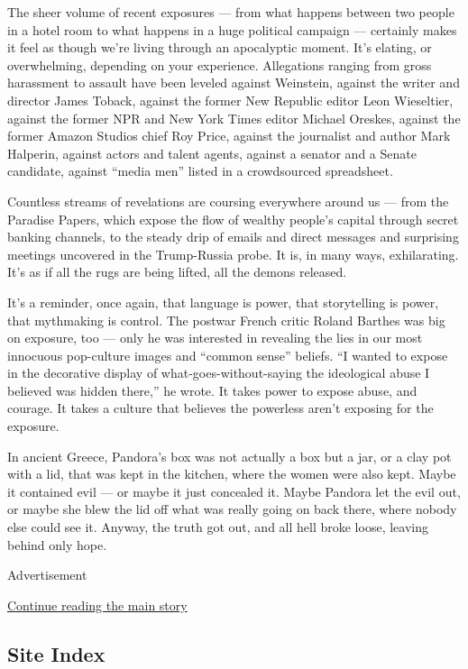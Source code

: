 The sheer volume of recent exposures --- from what happens between two
people in a hotel room to what happens in a huge political campaign ---
certainly makes it feel as though we're living through an apocalyptic
moment. It's elating, or overwhelming, depending on your experience.
Allegations ranging from gross harassment to assault have been leveled
against Weinstein, against the writer and director James Toback, against
the former New Republic editor Leon Wieseltier, against the former NPR
and New York Times editor Michael Oreskes, against the former Amazon
Studios chief Roy Price, against the journalist and author Mark
Halperin, against actors and talent agents, against a senator and a
Senate candidate, against ``media men'' listed in a crowdsourced
spreadsheet.

Countless streams of revelations are coursing everywhere around us ---
from the Paradise Papers, which expose the flow of wealthy people's
capital through secret banking channels, to the steady drip of emails
and direct messages and surprising meetings uncovered in the
Trump-Russia probe. It is, in many ways, exhilarating. It's as if all
the rugs are being lifted, all the demons released.

It's a reminder, once again, that language is power, that storytelling
is power, that mythmaking is control. The postwar French critic Roland
Barthes was big on exposure, too --- only he was interested in revealing
the lies in our most innocuous pop-culture images and ``common sense''
beliefs. ``I wanted to expose in the decorative display of
what-goes-without-saying the ideological abuse I believed was hidden
there,'' he wrote. It takes power to expose abuse, and courage. It takes
a culture that believes the powerless aren't exposing for the exposure.

In ancient Greece, Pandora's box was not actually a box but a jar, or a
clay pot with a lid, that was kept in the kitchen, where the women were
also kept. Maybe it contained evil --- or maybe it just concealed it.
Maybe Pandora let the evil out, or maybe she blew the lid off what was
really going on back there, where nobody else could see it. Anyway, the
truth got out, and all hell broke loose, leaving behind only hope.

Advertisement

\protect\hyperlink{after-bottom}{Continue reading the main story}

\hypertarget{site-index}{%
\subsection{Site Index}\label{site-index}}

